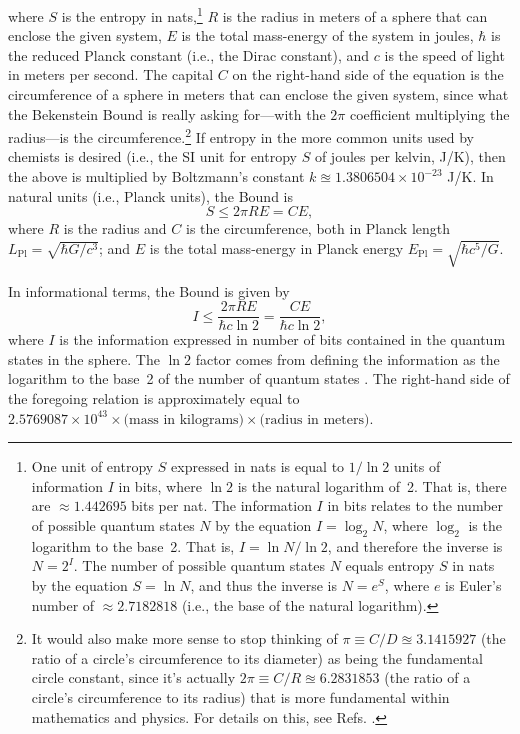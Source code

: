 \documentclass[letterpaper,12pt]{article}
\begin{document}
\begin{equation}
\end{equation} where \( S \) is the entropy in nats,\footnote{One unit of entropy \( S \) expressed in nats is equal to \( 1 / \ln 2 \) units of information \( I \) in bits, where \( \ln 2 \) is the natural logarithm of~2. That is, there are \( \approx 1.442695 \) bits per nat. The information \( I \) in bits relates to the number of possible quantum states \( N \) by the equation \( I = \log_2 N \), where \( \log_2 \) is the logarithm to the base~2. That is, \( I = \ln N / \ln 2 \), and therefore the inverse is \( N = 2^I \). The number of possible quantum states \( N \) equals entropy \( S \) in nats by the equation \( S = \ln N \), and thus the inverse is \( N = e^S \), where \( e \) is Euler's number of \( \approx 2.7182818 \) (i.e., the base of the natural logarithm).} \( R \) is the radius in meters of a sphere that can enclose the given system, \( E \) is the total mass-energy of the system in joules, \( \hbar \) is the reduced Planck constant (i.e., the Dirac constant), and \( c \) is the speed of light in meters per second. The capital \( C \) on the right-hand side of the equation is the circumference of a sphere in meters that can enclose the given system, since what the Bekenstein Bound is really asking for---with the \( 2 \pi \) coefficient multiplying the radius---is the circumference.\footnote{It would also make more sense to stop thinking of \( \pi \equiv C/D \approxeq 3.1415927 \) (the ratio of a circle's circumference to its diameter) as being the fundamental circle constant, since it's actually \( 2 \pi \equiv C/R \approxeq 6.2831853 \) (the ratio of a circle's circumference to its radius) that is more fundamental within mathematics and physics. For details on this, see Refs. .} If entropy in the more common units used by chemists is desired (i.e., the SI unit for entropy \( S \) of joules per kelvin, J/K), then the above is multiplied by Boltzmann's constant \( k \approxeq 1.3806504\times 10^{-23} \) J/K. In natural units (i.e., Planck units), the Bound is \begin{equation}
S \leq 2 \pi R E = C E,
\label{eq:BekensteinBoundNat}
\end{equation} where \( R \) is the radius and \( C \) is the circumference, both in Planck length \( L_\text{Pl} = \sqrt{\hbar G/c^3} \); and \( E \) is the total mass-energy in Planck energy \( E_\text{Pl} = \sqrt{\hbar c^5/G} \).

In informational terms, the Bound is given by \begin{equation}
I \leq \frac{2 \pi R E}{\hbar c \ln 2} = \frac{C E}{\hbar c \ln 2},
\label{eq:BekensteinBoundI}
\end{equation} where \( I \) is the information expressed in number of bits contained in the quantum states in the sphere. The \( \ln 2 \) factor comes from defining the information as the logarithm to the base~2 of the number of quantum states \cite{Tipler2005}. The right-hand side of the foregoing relation is approximately equal to \( 2.5769087\times 10^{43}\times \text{(mass in kilograms)}\times \text{(radius in meters)} \).
\end{document}
